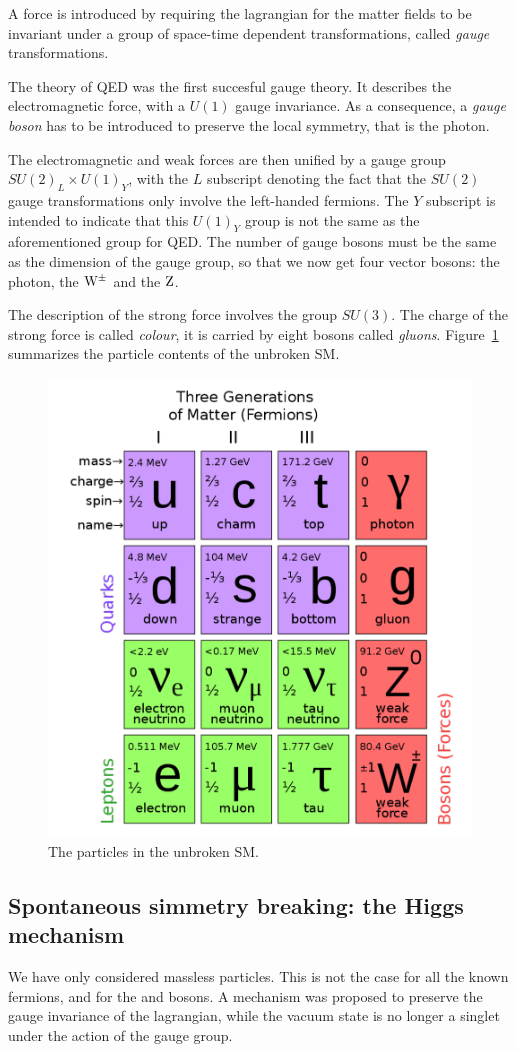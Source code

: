 A force is introduced by requiring the lagrangian for the matter fields to
be invariant under a group of space-time dependent transformations, called
\emph{gauge} transformations.

The theory of QED was the first succesful gauge theory.
It describes the electromagnetic force, with a $U(1)$ gauge
invariance. As a consequence, a \emph{gauge boson} has to be introduced to preserve
the local symmetry, that is the photon.

The electromagnetic and weak forces are then unified by a gauge group
$SU(2)_L \times U(1)_Y$, with the $L$ subscript denoting the fact that the
$SU(2)$ gauge transformations only involve the left-handed fermions.
The $Y$ subscript is intended to indicate that this $U(1)_Y$ group is not
the same as the aforementioned group for QED.
The number of gauge bosons must be the same as the dimension of the gauge
group, so that we now get four vector bosons: the photon, the $\mathrm{W}^\pm$ and
the $\mathrm{Z}$.

The description of the strong force involves the group $SU(3)$.
The charge of the strong force is called \emph{colour}, it is carried by eight bosons called \emph{gluons}.
Figure~\ref{fig:sm_particles} summarizes the particle contents of the
unbroken SM.

\begin{figure}[htb]
    \centering
    \includegraphics[width=.7\textwidth]{images/pdf/sm_particles}
    \caption{The particles in the unbroken SM.}
    \label{fig:sm_particles}
\end{figure}

\subsection{Spontaneous simmetry breaking: the Higgs mechanism}
We have only considered massless particles. This is not the case for all
the known fermions, and for the \W and \Z bosons. A mechanism was proposed
to preserve the gauge invariance of the lagrangian, while the vacuum state
is no longer a singlet under the action of the gauge group.

